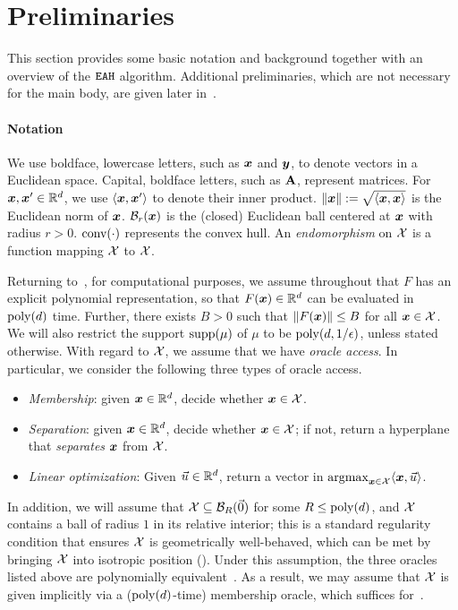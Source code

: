 \section{Preliminaries}
\label{sec:prel}

This section provides some basic notation and background together with an overview of the $\mathtt{EAH}$ algorithm. Additional preliminaries, which are not necessary for the main body, are given later in~.

\paragraph{Notation} We use boldface, lowercase letters, such as ${\bm{x}}$ and ${\bm{y}}$, to denote vectors in a Euclidean space. Capital, boldface letters, such as $\mathbf{A}$, represent matrices. For ${\bm{x}}, {\bm{x}}' \in \mathbb R^d$, we use $\langle {\bm{x}}, {\bm{x}}' \rangle$ to denote their inner product. $\|{\bm{x}}\| := \sqrt{ \langle {\bm{x}}, {\bm{x}} \rangle}$ is the Euclidean norm of ${\bm{x}}$. ${\mathcal{B}}_r({\bm{x}})$ is the (closed) Euclidean ball centered at ${\bm{x}}$ with radius $r > 0$. $\text{conv}(\cdot)$ represents the convex hull. An \emph{endomorphism} on ${\mathcal{X}}$ is a function mapping ${\mathcal{X}}$ to ${\mathcal{X}}$.

Returning to~, for computational purposes, we assume throughout that $F$ has an explicit polynomial representation, so that $F({\bm{x}}) \in \mathbb R^d$ can be evaluated in $\mathrm{poly}(d)$ time. Further, there exists $B > 0$ such that $\norm{F({\bm{x}})} \leq B$ for all ${\bm{x}} \in {\mathcal{X}}$. We will also restrict the support $\operatorname{supp}(\mu)$ of $\mu$ to be $\mathrm{poly}(d, 1/\epsilon)$, unless stated otherwise. With regard to ${\mathcal{X}}$, we assume that we have \emph{oracle access}. In particular, we consider the following three types of oracle access.

\begin{itemize}[nosep]
    \item \emph{Membership}: given ${\bm{x}} \in \mathbb R^d$, decide whether ${\bm{x}} \in {\mathcal{X}}$.
    \item \emph{Separation}: given ${\bm{x}} \in \mathbb R^d$, decide whether ${\bm{x}} \in {\mathcal{X}}$; if not, return a hyperplane that \emph{separates} ${\bm{x}}$ from ${\mathcal{X}}$.
    \item \emph{Linear optimization}: Given $\vec{u} \in \mathbb R^d$, return a vector in $\operatorname*{argmax}_{{\bm{x}} \in {\mathcal{X}}} \langle {\bm{x}}, \vec{u} \rangle $.
\end{itemize}

In addition, we will assume that ${\mathcal{X}} \subseteq {\mathcal{B}}_R(\vec{0})$ for some $R \leq \mathrm{poly}(d)$, and ${\mathcal{X}}$ contains a ball of radius $1$ in its relative interior; this is a standard regularity condition that ensures ${\mathcal{X}}$ is geometrically well-behaved, which can be met by bringing ${\mathcal{X}}$ into isotropic position (). Under this assumption, the three oracles listed above are polynomially equivalent~\citep{Grotschel12:Geometric,Groetschel81:ellipsoid}. As a result, we may assume that ${\mathcal{X}}$ is given implicitly via a ($\mathrm{poly}(d)$-time) membership oracle, which suffices for~.

